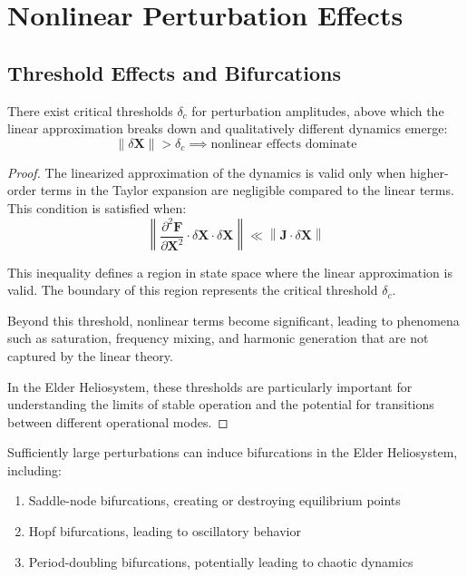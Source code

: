 \section{Nonlinear Perturbation Effects}

\subsection{Threshold Effects and Bifurcations}

\begin{theorem}
There exist critical thresholds $\delta_c$ for perturbation amplitudes, above which the linear approximation breaks down and qualitatively different dynamics emerge:
\begin{equation}
\|\delta\mathbf{X}\| > \delta_c \implies \text{nonlinear effects dominate}
\end{equation}
\end{theorem}

\begin{proof}
The linearized approximation of the dynamics is valid only when higher-order terms in the Taylor expansion are negligible compared to the linear terms. This condition is satisfied when:
\begin{equation}
\left\| \frac{\partial^2 \mathbf{F}}{\partial \mathbf{X}^2} \cdot \delta\mathbf{X} \cdot \delta\mathbf{X} \right\| \ll \left\| \mathbf{J} \cdot \delta\mathbf{X} \right\|
\end{equation}

This inequality defines a region in state space where the linear approximation is valid. The boundary of this region represents the critical threshold $\delta_c$.

Beyond this threshold, nonlinear terms become significant, leading to phenomena such as saturation, frequency mixing, and harmonic generation that are not captured by the linear theory.

In the Elder Heliosystem, these thresholds are particularly important for understanding the limits of stable operation and the potential for transitions between different operational modes.
\end{proof}

\begin{theorem}
Sufficiently large perturbations can induce bifurcations in the Elder Heliosystem, including:
\begin{enumerate}
    \item Saddle-node bifurcations, creating or destroying equilibrium points
    \item Hopf bifurcations, leading to oscillatory behavior
    \item Period-doubling bifurcations, potentially leading to chaotic dynamics
\end{enumerate}
\end{theorem}

